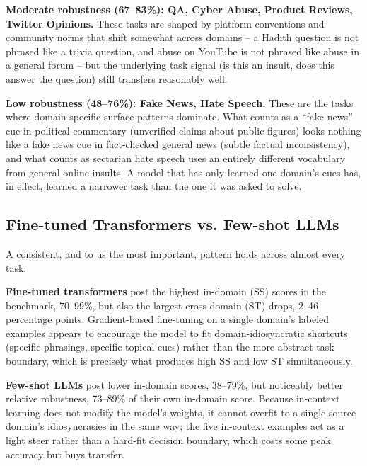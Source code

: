 \documentclass[10pt,twocolumn,journal]{IEEEtran}
\begin{document}
\textbf{Moderate robustness (67--83\%): QA, Cyber Abuse, Product Reviews, Twitter Opinions.} These tasks are shaped by platform conventions and community norms that shift somewhat across domains -- a Hadith question is not phrased like a trivia question, and abuse on YouTube is not phrased like abuse in a general forum -- but the underlying task signal (is this an insult, does this answer the question) still transfers reasonably well.

\textbf{Low robustness (48--76\%): Fake News, Hate Speech.} These are the tasks where domain-specific surface patterns dominate. What counts as a ``fake news'' cue in political commentary (unverified claims about public figures) looks nothing like a fake news cue in fact-checked general news (subtle factual inconsistency), and what counts as sectarian hate speech uses an entirely different vocabulary from general online insults. A model that has only learned one domain's cues has, in effect, learned a narrower task than the one it was asked to solve.

\subsection{Fine-tuned Transformers vs. Few-shot LLMs}

A consistent, and to us the most important, pattern holds across almost every task:

\textbf{Fine-tuned transformers} post the highest in-domain (SS) scores in the benchmark, 70--99\%, but also the largest cross-domain (ST) drops, 2--46 percentage points. Gradient-based fine-tuning on a single domain's labeled examples appears to encourage the model to fit domain-idiosyncratic shortcuts (specific phrasings, specific topical cues) rather than the more abstract task boundary, which is precisely what produces high SS and low ST simultaneously.

\textbf{Few-shot LLMs} post lower in-domain scores, 38--79\%, but noticeably better relative robustness, 73--89\% of their own in-domain score. Because in-context learning does not modify the model's weights, it cannot overfit to a single source domain's idiosyncrasies in the same way; the five in-context examples act as a light steer rather than a hard-fit decision boundary, which costs some peak accuracy but buys transfer.
\end{document}
